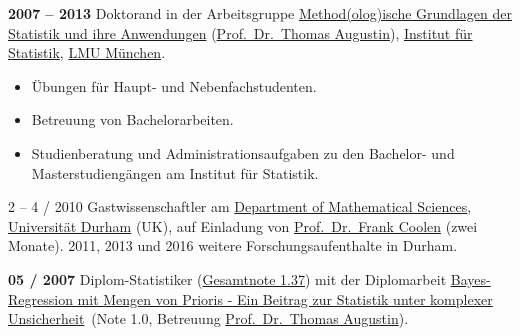 \documentclass[a4paper]{simplecv}
\begin{document}
\begin{topic}
\item[\hspace*{-2ex}\bfseries 2007 -- 2013] Doktorand in der Arbeitsgruppe
                    \href{http://www.statistik.lmu.de/institut/ag/agmg/index.html}{\glqq Method(olog)ische Grundlagen der Statistik und ihre Anwendungen\grqq}
                    (\href{http://www.statistik.lmu.de/~thomas/}{Prof.\ Dr.\ Thomas Augustin}),
                    \href{http://www.statistik.lmu.de/index.html}{Institut für Statistik}, \href{http://www.lmu.de/}{LMU München}.
\begin{itemize}
\item Übungen für Haupt- und Nebenfachstudenten.
\item Betreuung von Bachelorarbeiten.
\item Studienberatung und Administrationsaufgaben zu den Bachelor- und Masterstudiengängen am Institut für Statistik.
\end{itemize}

\item[2 -- 4 / 2010] Gastwissenschaftler am \href{http://www.dur.ac.uk/mathematical.sciences/}{Department of Mathematical Sciences},
                 \href{http://www.durham.ac.uk}{Universität Durham} (UK),
                 auf Einladung von \href{http://maths.dur.ac.uk/stats/people/fc/fc.html}{Prof.\ Dr.\ Frank Coolen} (zwei Monate).
                 2011, 2013 und 2016 weitere Forschungsaufenthalte in Durham.



\item[\hspace*{-2ex}\bfseries 05 / 2007] Diplom-Statistiker (\href{http://www.geeeero.de/files/diplom.pdf}{Gesamtnote 1.37}) mit der Diplomarbeit
\href{http://www.geeeero/files/Diplomarbeit_GeroWalter.pdf}{\glqq Bayes-\-Re\-gres\-sion mit Mengen von Prioris - Ein Beitrag zur Statistik unter komplexer Unsicherheit\grqq}\
(Note 1.0, Betreuung \href{http://www.statistik.lmu.de/~thomas/}{Prof.\ Dr.\ Thomas Augustin}).


\end{topic}
\end{document}
